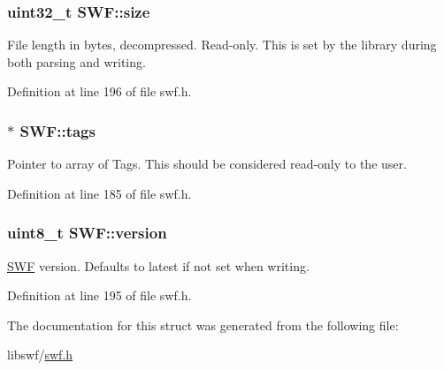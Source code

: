 \hypertarget{struct_s_w_f_a5e4ec5c09472acb241a3122606d833b2}{}
\subsubsection[{size}]{\setlength{\rightskip}{0pt plus 5cm}uint32\+\_\+t S\+W\+F\+::size}\label{struct_s_w_f_a5e4ec5c09472acb241a3122606d833b2}
File length in bytes, decompressed. Read-\/only. This is set by the library during both parsing and writing. 

Definition at line 196 of file swf.\+h.

\hypertarget{struct_s_w_f_a27238e7bdf4bb8961159b4c4a8913580}{}
\subsubsection[{tags}]{$\ast$ S\+W\+F\+::tags}\label{struct_s_w_f_a27238e7bdf4bb8961159b4c4a8913580}
Pointer to array of Tags. This should be considered read-\/only to the user. 

Definition at line 185 of file swf.\+h.

\hypertarget{struct_s_w_f_aafcab8c367361cc18461b683b9278ad0}{}
\subsubsection[{version}]{\setlength{\rightskip}{0pt plus 5cm}uint8\+\_\+t S\+W\+F\+::version}\label{struct_s_w_f_aafcab8c367361cc18461b683b9278ad0}


\hyperlink{struct_s_w_f}{S\+W\+F} version. Defaults to latest if not set when writing. 



Definition at line 195 of file swf.\+h.



The documentation for this struct was generated from the following file\+:\begin{DoxyCompactItemize}
\item 
libswf/\hyperlink{swf_8h}{swf.\+h}\end{DoxyCompactItemize}
